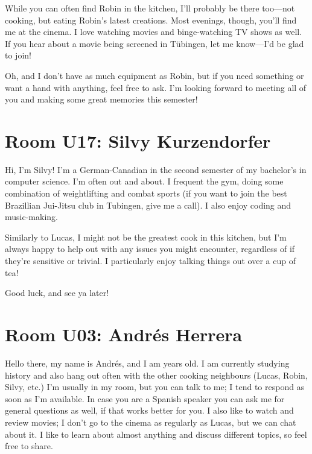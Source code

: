While you can often find Robin in the kitchen, I’ll probably be there too—not cooking, but eating Robin’s latest creations. Most evenings, though, you’ll find me at the cinema. I love watching movies and binge-watching TV shows as well. If you hear about a movie being screened in Tübingen, let me know—I’d be glad to join!  

Oh, and I don’t have as much equipment as Robin, but if you need something or want a hand with anything, feel free to ask. I’m looking forward to meeting all of you and making some great memories this semester!

\section{Room U17: Silvy Kurzendorfer} \label{sec:silvyK}
%
\FPsub\result{\theCurrentDate}{\theBirthdate}
\FPdiv{}
\FPtrunc{}

Hi, I'm Silvy! I'm a German-Canadian in the second semester of my bachelor's in computer science. I'm often out and about. I frequent the gym, doing some combination of weightlifting and combat sports (if you want to join the best Brazillian Jui-Jitsu club in Tubingen, give me a call). I also enjoy coding and music-making. 

Similarly to Lucas, I might not be the greatest cook in this kitchen, but I'm always happy to help out with any issues you might encounter, regardless of if they're sensitive or trivial. I particularly enjoy talking things out over a cup of tea!

Good luck, and see ya later!

\section{Room U03: Andrés Herrera} \label{sec:andresH}
%
\FPsub\result{\theCurrentDate}{\theBirthdate}
\FPdiv{}
\FPtrunc{}

Hello there, my name is Andrés, and I am \myage{} years old. I am currently studying history and also hang out often with the other cooking neighbours (Lucas, Robin, Silvy, etc.) I’m usually in my room, but you can talk to me; I tend to respond as soon as I’m available. In case you are a Spanish speaker you can ask me for general questions as well, if that works better for you. I also like to watch and review movies; I don’t go to the cinema as regularly as Lucas, but we can chat about it. I like to learn about almost anything and discuss different topics, so feel free to share.

